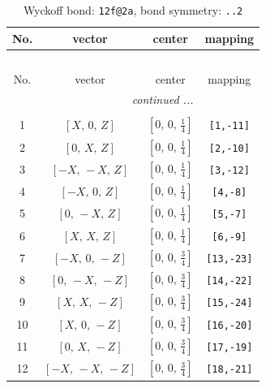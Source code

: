 \documentclass[fleqn,8pt]{jsarticle}
\begin{document}
\renewcommand{\arraystretch}{1.2}
\begin{longtable}{cccc}
\caption{Wyckoff bond: {\tt 12f@2a}, bond symmetry: {\tt ..2}}
 \\
 \hline \hline
No. & vector & center & mapping \\ \hline \endfirsthead

\multicolumn{3}{l}{\tablename\ \thetable{}} \\
 \hline \hline
No. & vector & center & mapping \\ \hline \endhead

 \hline \hline
\multicolumn{3}{r}{\footnotesize\it continued ...} \\ \endfoot

 \hline \hline
\multicolumn{3}{r}{} \\ \endlastfoot

1 & $\left[ X,\, 0,\, Z \right]$ & $\left[ 0,\, 0,\, \frac{1}{4} \right]$ & {\tt [1,-11]} \\ \hline
2 & $\left[ 0,\, X,\, Z \right]$ & $\left[ 0,\, 0,\, \frac{1}{4} \right]$ & {\tt [2,-10]} \\ \hline
3 & $\left[ - X,\, - X,\, Z \right]$ & $\left[ 0,\, 0,\, \frac{1}{4} \right]$ & {\tt [3,-12]} \\ \hline
4 & $\left[ - X,\, 0,\, Z \right]$ & $\left[ 0,\, 0,\, \frac{1}{4} \right]$ & {\tt [4,-8]} \\ \hline
5 & $\left[ 0,\, - X,\, Z \right]$ & $\left[ 0,\, 0,\, \frac{1}{4} \right]$ & {\tt [5,-7]} \\ \hline
6 & $\left[ X,\, X,\, Z \right]$ & $\left[ 0,\, 0,\, \frac{1}{4} \right]$ & {\tt [6,-9]} \\ \hline
7 & $\left[ - X,\, 0,\, - Z \right]$ & $\left[ 0,\, 0,\, \frac{3}{4} \right]$ & {\tt [13,-23]} \\ \hline
8 & $\left[ 0,\, - X,\, - Z \right]$ & $\left[ 0,\, 0,\, \frac{3}{4} \right]$ & {\tt [14,-22]} \\ \hline
9 & $\left[ X,\, X,\, - Z \right]$ & $\left[ 0,\, 0,\, \frac{3}{4} \right]$ & {\tt [15,-24]} \\ \hline
10 & $\left[ X,\, 0,\, - Z \right]$ & $\left[ 0,\, 0,\, \frac{3}{4} \right]$ & {\tt [16,-20]} \\ \hline
11 & $\left[ 0,\, X,\, - Z \right]$ & $\left[ 0,\, 0,\, \frac{3}{4} \right]$ & {\tt [17,-19]} \\ \hline
12 & $\left[ - X,\, - X,\, - Z \right]$ & $\left[ 0,\, 0,\, \frac{3}{4} \right]$ & {\tt [18,-21]} \\
\end{longtable}
\end{document}
